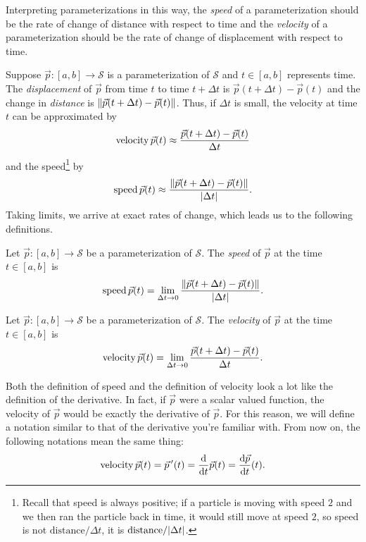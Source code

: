 Interpreting parameterizations in this way, the \emph{speed} of a parameterization
should be the rate of change of distance with respect to time and the \emph{velocity}
of a parameterization should be the rate of change of displacement with respect to time.

Suppose $\vec p:[a,b]\to\mathcal S$ is a parameterization of $\mathcal S$ and $t\in[a,b]$
represents time.  The \emph{displacement} of $\vec p$ from time $t$ to time $t+\Delta t$ is
$\vec p(t+\Delta t)-\vec p(t)$ and the change in \emph{distance} is $\lVert\vec p(t+\Delta t) - \vec p(t)\rVert$.
Thus, if $\Delta t$ is small, the velocity at time $t$ can be approximated by
\[
		\operatorname{velocity} \vec p(t) \approx \frac{\vec p(t+\Delta t) - \vec p(t)}{\Delta t}	
\]
and the speed\footnote{
		Recall that speed is always positive; if a particle is moving with speed $2$
		and we then ran the particle back in time, it would still move at speed $2$,
		so speed is not $\text{distance}/\Delta t$, it is $\text{distance}/\lvert\Delta t\rvert$.
		} by
\[
	\operatorname{speed} \vec p(t) \approx \frac{\lVert\vec p(t+\Delta t) - \vec p(t)\rVert}{\lvert\Delta t\rvert}.	
\]
Taking limits, we arrive at exact rates of change, which leads us to the following definitions.
\begin{definition}[Speed]
	Let $\vec p:[a,b]\to\mathcal S$ be a parameterization of $\mathcal S$.  The
	\emph{speed} of $\vec p$ at the time $t\in[a,b]$ is 
	\[
		\operatorname{speed} \vec p(t) = \lim_{\Delta t\to 0} \frac{\lVert\vec p(t+\Delta t) - \vec p(t)\rVert}{\lvert\Delta t\rvert}.	
	\]
\end{definition}
\begin{definition}[Velocity]
	Let $\vec p:[a,b]\to\mathcal S$ be a parameterization of $\mathcal S$.  The
	\emph{velocity} of $\vec p$ at the time $t\in[a,b]$ is 
	\[
		\operatorname{velocity} \vec p(t) = \lim_{\Delta t\to 0} \frac{\vec p(t+\Delta t) - \vec p(t)}{\Delta t}.	
	\]
\end{definition}

Both the definition of speed and the definition of velocity look a lot like the definition
of the derivative.  In fact, if $\vec p$ were a scalar valued function, the velocity of $\vec p$
would be exactly the derivative of $\vec p$.  For this reason, we will define a notation
similar to that of the derivative you're familiar with.  From now on, the following notations mean
the same thing:
\[
	\operatorname{velocity} \vec p(t) = \vec p\,'(t) = \frac{\mathrm{d}}{\mathrm{d} t}\vec p(t) = \frac{\mathrm{d} \vec p}{\mathrm{d} t}(t).
\]

